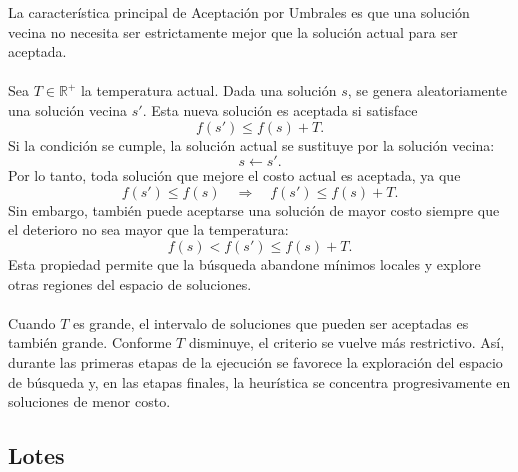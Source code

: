 \documentclass[12pt]{article}
\begin{document}
La característica principal de Aceptación por Umbrales es que una solución
vecina no necesita ser estrictamente mejor que la solución actual para ser
aceptada.
\\\\
Sea \(T\in\mathbb{R}^{+}\) la temperatura actual. Dada una solución
\(s\), se genera aleatoriamente una solución vecina \(s'\). Esta nueva
solución es aceptada si satisface
\[
    \boxed{
        f(s')\leq f(s)+T
    }.
\]
Si la condición se cumple, la solución actual se sustituye por la solución
vecina:
\[
    s\leftarrow s'.
\]
Por lo tanto, toda solución que mejore el costo actual es aceptada, ya que
\[
    f(s')\leq f(s)
    \quad\Longrightarrow\quad
    f(s')\leq f(s)+T.
\]
Sin embargo, también puede aceptarse una solución de mayor costo siempre que
el deterioro no sea mayor que la temperatura:
\[
    f(s)<f(s')\leq f(s)+T.
\]
Esta propiedad permite que la búsqueda abandone mínimos locales y explore
otras regiones del espacio de soluciones.
\\\\
Cuando \(T\) es grande, el intervalo de soluciones que pueden ser aceptadas
es también grande. Conforme \(T\) disminuye, el criterio se vuelve más
restrictivo. Así, durante las primeras etapas de la ejecución se favorece la
exploración del espacio de búsqueda y, en las etapas finales, la heurística
se concentra progresivamente en soluciones de menor costo.

\subsection{Lotes}
\label{subsec:lotes}
\end{document}

